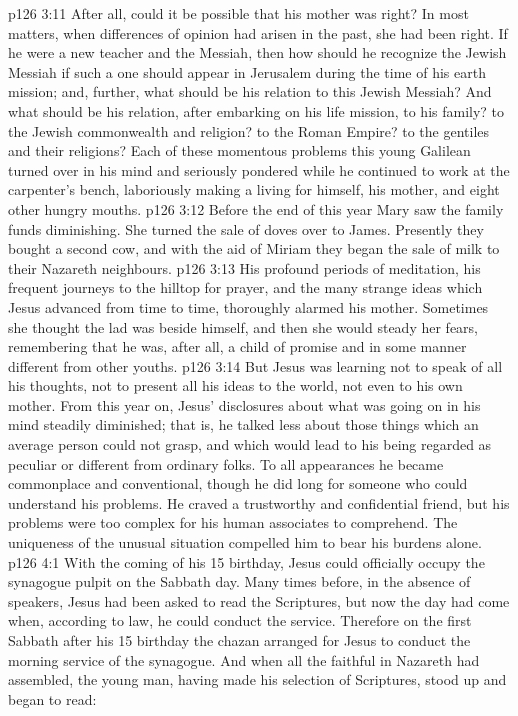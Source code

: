 \vs p126 3:11 After all, could it be possible that his mother was right? In most matters, when differences of opinion had arisen in the past, she had been right. If he were a new teacher and  the Messiah, then how should he recognize the Jewish Messiah if such a one should appear in Jerusalem during the time of his earth mission; and, further, what should be his relation to this Jewish Messiah? And what should be his relation, after embarking on his life mission, to his family? to the Jewish commonwealth and religion? to the Roman Empire? to the gentiles and their religions? Each of these momentous problems this young Galilean turned over in his mind and seriously pondered while he continued to work at the carpenter’s bench, laboriously making a living for himself, his mother, and eight other hungry mouths.
\vs p126 3:12 \pc Before the end of this year Mary saw the family funds diminishing. She turned the sale of doves over to James. Presently they bought a second cow, and with the aid of Miriam they began the sale of milk to their Nazareth neighbours.
\vs p126 3:13 \pc His profound periods of meditation, his frequent journeys to the hilltop for prayer, and the many strange ideas which Jesus advanced from time to time, thoroughly alarmed his mother. Sometimes she thought the lad was beside himself, and then she would steady her fears, remembering that he was, after all, a child of promise and in some manner different from other youths.
\vs p126 3:14 But Jesus was learning not to speak of all his thoughts, not to present all his ideas to the world, not even to his own mother. From this year on, Jesus’ disclosures about what was going on in his mind steadily diminished; that is, he talked less about those things which an average person could not grasp, and which would lead to his being regarded as peculiar or different from ordinary folks. To all appearances he became commonplace and conventional, though he did long for someone who could understand his problems. He craved a trustworthy and confidential friend, but his problems were too complex for his human associates to comprehend. The uniqueness of the unusual situation compelled him to bear his burdens alone.
\vs p126 4:1 With the coming of his 15 birthday, Jesus could officially occupy the synagogue pulpit on the Sabbath day. Many times before, in the absence of speakers, Jesus had been asked to read the Scriptures, but now the day had come when, according to law, he could conduct the service. Therefore on the first Sabbath after his 15 birthday the chazan arranged for Jesus to conduct the morning service of the synagogue. And when all the faithful in Nazareth had assembled, the young man, having made his selection of Scriptures, stood up and began to read:
